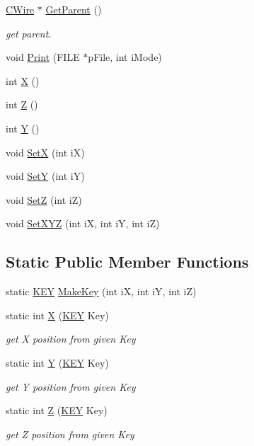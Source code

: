 \begin{DoxyCompactItemize}
\mbox{\hyperlink{classCWire}{C\+Wire}} $\ast$ \mbox{\hyperlink{classCPoint_ac87cc89b531011be9c848630da1343b7}{Get\+Parent}} ()
\begin{DoxyCompactList}\small\item\em get parent. \end{DoxyCompactList}\item 
void \mbox{\hyperlink{classCPoint_a1610463f19b7ff508ed229791dd6335d}{Print}} (F\+I\+LE $\ast$p\+File, int i\+Mode)
\item 
int \mbox{\hyperlink{classCPoint_aeb92159e1d1045ceab79eea735d22af2}{X}} ()
\item 
int \mbox{\hyperlink{classCPoint_a6d03d17763a148af852d10a9a410167e}{Z}} ()
\item 
int \mbox{\hyperlink{classCPoint_a8543d7ba2b9d1f9ec3373bd8258a66d0}{Y}} ()
\item 
void \mbox{\hyperlink{classCPoint_ac9557dddaefffd4c7cc0a20090ef5324}{SetX}} (int iX)
\item 
void \mbox{\hyperlink{classCPoint_a984d81a6620d3bcf3df8dc14c42f2a1d}{SetY}} (int iY)
\item 
void \mbox{\hyperlink{classCPoint_abc4fb18e1e3ca6545e6f6e4c7cb0e555}{SetZ}} (int iZ)
\item 
void \mbox{\hyperlink{classCPoint_ae8364b4fc6b31f4a844f38a13f2251c7}{Set\+X\+YZ}} (int iX, int iY, int iZ)
\end{DoxyCompactItemize}
\subsection*{Static Public Member Functions}
\begin{DoxyCompactItemize}
\item 
static \mbox{\hyperlink{res2dmp_8cpp_a8ae9d53f33f46cfcfcb9736e6351452a}{K\+EY}} \mbox{\hyperlink{classCPoint_aa93327a1be5e5d9df55f3eb9750af25d}{Make\+Key}} (int iX, int iY, int iZ)
\item 
static int \mbox{\hyperlink{classCPoint_aa748e36b6641c6259ca45e1cb7017f58}{X}} (\mbox{\hyperlink{res2dmp_8cpp_a8ae9d53f33f46cfcfcb9736e6351452a}{K\+EY}} Key)
\begin{DoxyCompactList}\small\item\em get X position from given Key \end{DoxyCompactList}\item 
static int \mbox{\hyperlink{classCPoint_a2760f11ef7f482c28c0385ef402faa9f}{Y}} (\mbox{\hyperlink{res2dmp_8cpp_a8ae9d53f33f46cfcfcb9736e6351452a}{K\+EY}} Key)
\begin{DoxyCompactList}\small\item\em get Y position from given Key \end{DoxyCompactList}\item 
static int \mbox{\hyperlink{classCPoint_a896823777dbcd50cceec722a9fee6ddb}{Z}} (\mbox{\hyperlink{res2dmp_8cpp_a8ae9d53f33f46cfcfcb9736e6351452a}{K\+EY}} Key)
\begin{DoxyCompactList}\small\item\em get Z position from given Key \end{DoxyCompactList}\end{DoxyCompactItemize}
